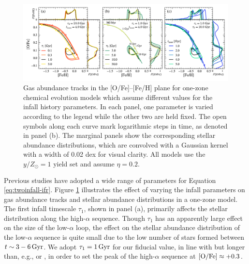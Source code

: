 \documentclass[twocolumn,twocolappendix,linenumbers]{aastex631}
\newcommand{\mathOFe}{{\rm [O/Fe]}}
\newcommand{\yZ}[1]{$y/Z_\odot=#1$}
\begin{document}
\begin{figure}
    \centering
    \includegraphics{figures/onezone_params.pdf}
    \caption{Gas abundance tracks in the [O/Fe]--[Fe/H] plane for one-zone chemical evolution models which assume different values for the infall history parameters. In each panel, one parameter is varied according to the legend while the other two are held fixed. The open symbols along each curve mark logarithmic steps in time, as denoted in panel (b). The marginal panels show the corresponding stellar abundance distributions, which are convolved with a Gaussian kernel with a width of 0.02 dex for visual clarity. All models use the \yZ{1} yield set and assume $\eta=0.2$.}
    \label{fig:twoinfall-parameters}
\end{figure}

Previous studies have adopted a wide range of parameters for Equation \ref{eq:twoinfall-ifr}. Figure \ref{fig:twoinfall-parameters} illustrates the effect of varying the infall parameters on gas abundance tracks and stellar abundance distributions in a one-zone model. The first infall timescale $\tau_1$, shown in panel (a), primarily affects the stellar distribution along the high-$\alpha$ sequence. Though $\tau_1$ has an apparently large effect on the size of the low-$\alpha$ loop, the effect on the stellar abundance distribution of the low-$\alpha$ sequence is quite small due to the low number of stars formed between $t\sim3-6\,{\rm Gyr}$. We adopt $\tau_1=1\,{\rm Gyr}$ for our fiducial value, in line with \citet{spitoni_galactic_2020} but longer than, e.g., \citet{nissen_high-precision_2020} or \citet{spitoni_apogee_2021}, in order to set the peak of the high-$\alpha$ sequence at $\mathOFe\approx+0.3$. 
\end{document}
